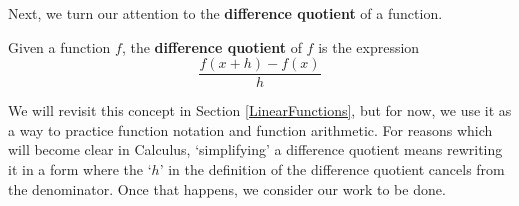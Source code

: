 \pagebreak

Next, we turn our attention to the \textbf{difference quotient} of a function.  

\medskip

\colorbox{ResultColor}{\bbm

\begin{defn}

\label{differencequotient}

Given a function $f$, the \textbf{difference quotient} of $f$ is the expression \[ \dfrac{f(x+h) - f(x)}{h} \]

\end{defn}

\ebm}

\medskip

We will revisit this concept in Section \ref{LinearFunctions}, but for now, we use it as a way to practice function notation and function arithmetic.  For reasons which will become clear in Calculus,  `simplifying' a difference quotient means rewriting it in a form where the `$h$' in the definition of the difference quotient cancels from the denominator. Once that happens, we consider our work to be done.

